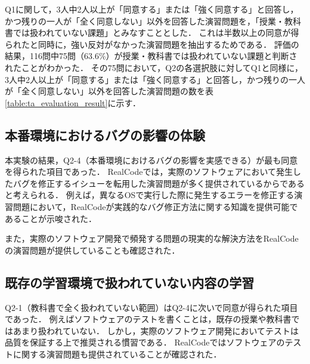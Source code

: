 Q1に関して，3人中2人以上が「同意する」または「強く同意する」と回答し，かつ残りの一人が「全く同意しない」以外を回答した演習問題を，「授業・教科書では扱われていない課題」とみなすこととした．
これは半数以上の同意が得られたと同時に，強い反対がなかった演習問題を抽出するためである．
評価の結果，116問中75問（63.6\%）が授業・教科書では扱われていない課題と判断されたことがわかった．
その75問において，Q2の各選択肢に対してQ1と同様に，3人中2人以上が「同意する」または「強く同意する」と回答し，かつ残りの一人が「全く同意しない」以外を回答した演習問題の数を表\ref{table:ta_evaluation_result}に示す．

\subsection*{本番環境におけるバグの影響の体験}

本実験の結果，Q2-4（本番環境におけるバグの影響を実感できる）が最も同意を得られた項目であった．
RealCodeでは，実際のソフトウェアにおいて発生したバグを修正するイシューを転用した演習問題が多く提供されているからであると考えられる．
例えば，異なるOSで実行した際に発生するエラーを修正する演習問題において，RealCodeが実践的なバグ修正方法に関する知識を提供可能であることが示唆された．


また，実際のソフトウェア開発で頻発する問題の現実的な解決方法をRealCodeの演習問題が提供していることも確認された．




\subsection*{既存の学習環境で扱われていない内容の学習}

Q2-1（教科書で全く扱われていない範囲）はQ2-4に次いで同意が得られた項目であった．
例えばソフトウェアのテストを書くことは，既存の授業や教科書ではあまり扱われていない．
しかし，実際のソフトウェア開発においてテストは品質を保証する上で推奨される慣習である．
RealCodeではソフトウェアのテストに関する演習問題も提供されていることが確認された．


